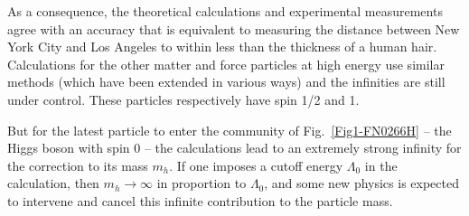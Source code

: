 \documentclass[12pt]{iopart}
\begin{document}
As a consequence, the theoretical calculations and experimental measurements agree with an accuracy that is equivalent to measuring the distance between New York City and Los Angeles to within less than the thickness of a human hair. Calculations for the other matter and force particles at high energy use similar methods (which have been extended in various ways) and the infinities are still under control. These particles respectively have spin 1/2 and 1. 

But for the latest particle to enter the community of Fig.~\ref{Fig1-FN0266H} -- the Higgs boson with spin 0 -- the calculations lead to an extremely strong infinity for the correction to its mass $m_h$. If one imposes a cutoff energy $\Lambda_0$ in the calculation, then $m_h \rightarrow \infty$ in proportion to $\Lambda_0$, and some new physics is expected to intervene and cancel this infinite contribution to the particle mass.
\end{document}
